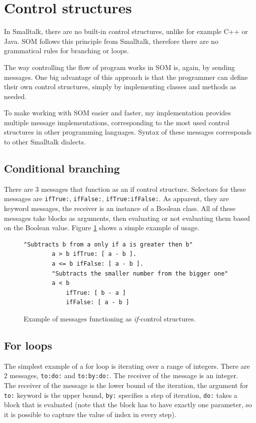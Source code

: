 \documentclass[thesis=M,english]{FITthesis}[2019/12/23]
\begin{document}
\section{Control structures}
In Smalltalk, there are no built-in control structures, unlike for example C++ or Java. SOM follows this principle
from Smalltalk, therefore there are no grammatical rules for branching or loops.

The way controlling the flow of program works in SOM is, again, by sending messages. One big advantage of this 
approach is that the programmer can define their own control structures, simply by implementing classes and
methods as needed.

To make working with SOM easier and faster, my implementation provides multiple message implementations, 
corresponding to the most used control structures in other programming languages. Syntax of these messages
corresponds to other Smalltalk dialects.

\subsection{Conditional branching}
There are 3 messages that function as an if control structure. Selectors for these messages are \texttt{ifTrue:},
\texttt{ifFalse:}, \texttt{ifTrue:ifFalse:}. As apparent, they are keyword messages, the receiver is an instance of
a Boolean class. All of these messages take blocks as arguments, then evaluating or not evaluating them based on
the Boolean value. Figure \ref{lst-if-control} shows a simple example of usage.

\begin{figure}[h!]
	\begin{lstlisting}[language=Smalltalk]
		"Subtracts b from a only if a is greater then b"
		a > b ifTrue: [ a - b ].
		a <= b ifFalse: [ a - b ].
		"Subtracts the smaller number from the bigger one"
		a < b
			ifTrue: [ b - a ]
			ifFalse: [ a - b ]
	\end{lstlisting}
	\caption{Example of messages functioning as \textit{if-}control structures.}
	\label{lst-if-control}
\end{figure}

\subsection{For loops}
The simplest example of a for loop is iterating over a range of integers. There are 2 messages, \texttt{to:do:} and  \texttt{to:by:do:}.
The receiver of the message is an integer. The receiver of the message is the lower bound of the iteration, the argument for \texttt{to:}
keyword is the upper bound, \texttt{by:} specifies a step of iteration, \texttt{do:} takes a block that is evaluated (note that the block
has to have exactly one parameter, so it is possible to capture the value of index in every step).
\end{document}
